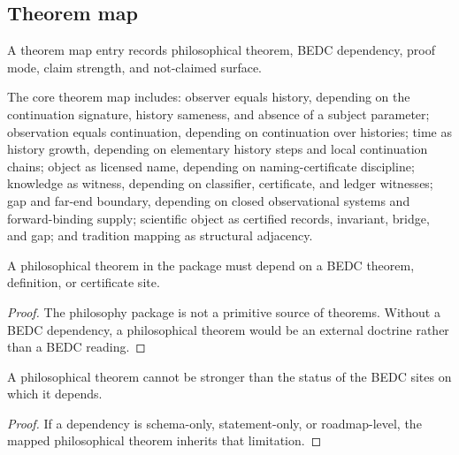 \subsection{Theorem map}
\label{subsec:philosophy-theorem-map}

\begin{definition}
\label{def:philosophy-theorem-map-entry}
A theorem map entry records philosophical theorem, BEDC dependency,
proof mode, claim strength, and not-claimed surface.
\end{definition}

\begin{definition}
\label{def:philosophy-core-theorem-map}
The core theorem map includes: observer equals history, depending on
the continuation signature, history sameness, and absence of a subject
parameter; observation equals continuation, depending on continuation
over histories; time as history growth, depending on elementary history
steps and local continuation chains; object as licensed name, depending
on naming-certificate discipline; knowledge as witness, depending on
classifier, certificate, and ledger witnesses; gap and far-end boundary,
depending on closed observational systems and forward-binding supply;
scientific object as certified records, invariant, bridge, and gap;
and tradition mapping as structural adjacency.
\end{definition}

\begin{theorem}
\label{thm:philosophy-theorems-depend-bedc-sites}
A philosophical theorem in the package must depend on a BEDC theorem,
definition, or certificate site.
\end{theorem}
\begin{proof}
The philosophy package is not a primitive source of theorems. Without a
BEDC dependency, a philosophical theorem would be an external doctrine
rather than a BEDC reading.
\end{proof}

\begin{corollary}
\label{cor:philosophy-theorem-map-strength-bounded}
A philosophical theorem cannot be stronger than the status of the BEDC
sites on which it depends.
\end{corollary}
\begin{proof}
If a dependency is schema-only, statement-only, or roadmap-level, the
mapped philosophical theorem inherits that limitation.
\end{proof}

